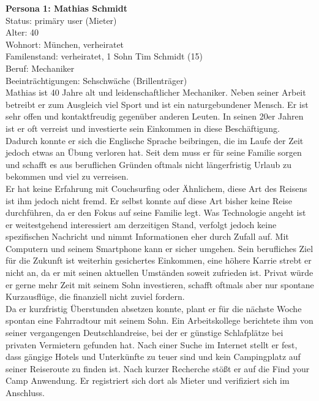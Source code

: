 \textbf{Persona 1: Mathias Schmidt}\\
Status: primäry user (Mieter)\\

Alter: 40 \\
Wohnort: München, verheiratet\\
Familenstand: verheiratet, 1 Sohn Tim Schmidt (15)\\
Beruf: Mechaniker\\
Beeinträchtigungen: Sehschwäche (Brillenträger) \\

Mathias ist 40 Jahre alt und leidenschaftlicher Mechaniker. Neben seiner Arbeit betreibt er zum Ausgleich viel Sport und ist ein naturgebundener Mensch.
Er ist sehr offen und kontaktfreudig gegenüber anderen Leuten. In seinen 20er Jahren ist er oft verreist und investierte sein Einkommen in diese Beschäftigung. Dadurch konnte er sich die Englische Sprache beibringen, die im Laufe der Zeit jedoch etwas an Übung verloren hat. Seit dem muss er für seine Familie sorgen und schafft es aus beruflichen Gründen oftmals nicht längerfristig Urlaub zu bekommen und viel zu verreisen.\\

Er hat keine Erfahrung mit Couchsurfing oder Ähnlichem, diese Art des Reisens ist ihm jedoch nicht fremd. Er selbst konnte auf diese Art bisher keine Reise durchführen, da er den Fokus auf seine Familie legt.
Was Technologie angeht ist er weitestgehend interessiert am derzeitigen Stand, verfolgt jedoch keine spezifischen Nachricht und nimmt Informationen eher durch Zufall auf. Mit Computern und seinem Smartphone kann er sicher umgehen. Sein berufliches Ziel für die Zukunft ist weiterhin gesichertes Einkommen, eine höhere Karrie strebt er nicht an, da er mit seinen aktuellen Umständen soweit zufrieden ist. Privat würde er gerne mehr Zeit mit seinem Sohn investieren, schafft oftmals aber nur spontane Kurzausflüge, die finanziell nicht zuviel fordern.\\

Da er kurzfristig Überstunden absetzen konnte, plant er für die nächste Woche spontan eine Fahrradtour mit seinem Sohn. Ein Arbeitskollege berichtete ihm von seiner vergangengen Deutschlandreise, bei der er günstige Schlafplätze bei privaten Vermietern gefunden hat. Nach einer Suche im Internet stellt er fest, dass gängige Hotels und Unterkünfte zu teuer sind und kein Campingplatz auf seiner Reiseroute zu finden ist. Nach kurzer Recherche stößt er auf die Find your Camp Anwendung.
Er registriert sich dort als Mieter und verifiziert sich im Anschluss.



